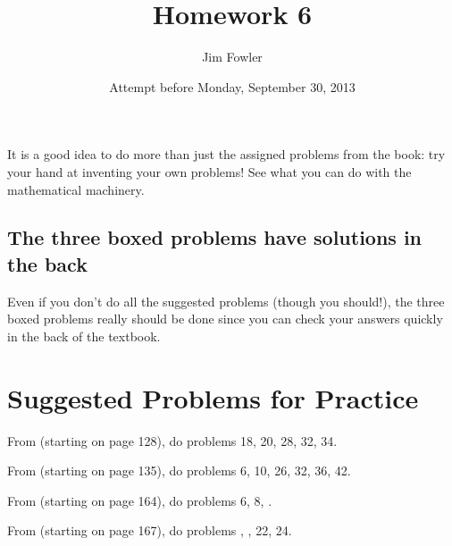 \documentclass[12pt]{handout}
\title{Homework 6}
\date{Attempt before Monday, September 30, 2013}
\author{Jim Fowler}
\begin{document}
\maketitle





It is a good idea to do more than just the assigned problems from the
book: try your hand at inventing your own problems!  See what you can do with the
mathematical machinery.





\subsection*{The three boxed problems have solutions in the back}
Even if you don't do all the suggested problems (though you should!), the three boxed problems really should be done since you can check your answers quickly in the back of the textbook.

\section*{Suggested Problems for Practice}

From  (starting on page 128),
do problems 18, 20, 28, 32, 34.
\vspace{1ex}

From  (starting on page 135),
do problems 6, 10, 26, 32, 36, 42.
\vspace{1ex}

From  (starting on page 164),
do problems 6, 8, .
\vspace{1ex}

From  (starting on page 167),
do problems , , 22, 24.
\vspace{1ex}
\end{document}
